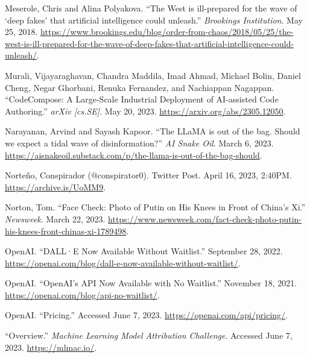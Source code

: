 \documentclass{article}
\begin{document}
\begin{thebibliography}{9}
  Meserole, Chris and Alina Polyakova. ``The West is ill-prepared for the wave of `deep fakes' that artificial intelligence could unleash.'' \textit{Brookings Institution}. May 25, 2018. \href{https://www.brookings.edu/blog/order-from-chaos/2018/05/25/the-west-is-ill-prepared-for-the-wave-of-deep-fakes-that-artificial-intelligence-could-unleash/}{https://www.brookings.edu/blog/order-from-chaos/2018/05/25/the-west-is-ill-prepared-for-the-wave-of-deep-fakes-that-artificial-intelligence-could-unleash/}. 

  Murali, Vijayaraghavan, Chandra Maddila, Imad Ahmad, Michael Bolin, Daniel Cheng, Negar Ghorbani, Renuka Fernandez, and Nachiappan Nagappan. ``CodeCompose: A Large-Scale Industrial Deployment of AI-assisted Code Authoring.'' \textit{arXiv [cs.SE]}. May 20, 2023. \href{https://arxiv.org/abs/2305.12050}{https://arxiv.org/abs/2305.12050}. 

  Narayanan, Arvind and Sayash Kapoor. ``The LLaMA is out of the bag. Should we expect a tidal wave of disinformation?'' \textit{AI Snake Oil}. March 6, 2023. \href{https://aisnakeoil.substack.com/p/the-llama-is-out-of-the-bag-should}{https://aisnakeoil.substack.com/p/the-llama-is-out-of-the-bag-should}.

  Norteño, Conspirador (@conspirator0). Twitter Post. April 16, 2023, 2:40PM. \href{https://archive.is/UoMM9}{https://archive.is/UoMM9}. 

  Norton, Tom. ``Face Check: Photo of Putin on His Knees in Front of China's Xi.'' \textit{Newsweek}. March 22, 2023. \href{https://www.newsweek.com/fact-check-photo-putin-his-knees-front-chinas-xi-1789498}{https://www.newsweek.com/fact-check-photo-putin-his-knees-front-chinas-xi-1789498}. 

  OpenAI. ``DALL·E Now Available Without Waitlist.'' September 28, 2022. \href{https://openai.com/blog/dall-e-now-available-without-waitlist/}{https://openai.com/blog/dall-e-now-available-without-waitlist/}.

  OpenAI. ``OpenAI's API Now Available with No Waitlist.'' November 18, 2021. \href{https://openai.com/blog/api-no-waitlist/}{https://openai.com/blog/api-no-waitlist/}.

  OpenAI. ``Pricing.'' Accessed June 7, 2023. \href{https://openai.com/api/pricing/}{https://openai.com/api/pricing/}.

  ``Overview.'' \textit{Machine Learning Model Attribution Challenge}. Accessed June 7, 2023. \href{https://mlmac.io/}{https://mlmac.io/}. 


\end{thebibliography}
\end{document}

